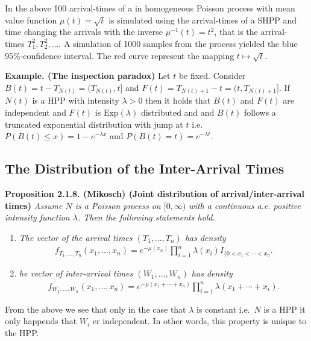 \documentclass[a4paper,12pt,openany]{book}
\providecommand{\tightlist}{%
 \setlength{\itemsep}{0pt}\setlength{\parskip}{0pt}}
\begin{document}
In the above 100 arrival-times of a in homogeneous Poisson process with mean value function \(\mu(t)=\sqrt{t}\) is simulated using the arrival-times of a SHPP and time changing the arrivals with the inverse \(\mu^{-1}(t)=t^2\), that is the arrival- times \(T_1^2,T_2^2,...\). A simulation of 1000 samples from the process yielded the blue 95\%-confidence interval. The red curve represent the mapping \(t\mapsto \sqrt{t}\).

\textbf{Example. (The inspection paradox)} Let \(t\) be fixed. Consider \(B(t)=t-T_{N(t)}=(T_{N(t)},t]\) and \(F(t)=T_{N(t)+1}-t=(t,T_{N(t)+1}]\). If \(N(t)\) is a HPP with intensity \(\lambda>0\) then it holds that \(B(t)\) and \(F(t)\) are independent and \(F(t)\) is \(\text{Exp}(\lambda)\) distributed and and \(B(t)\) follows a truncated exponential distribution with jump at \(t\) i.e.~\(P(B(t)\le x)=1-e^{-\lambda x}\) and \(P(B(t)=t)=e^{-\lambda t}\).

\hypertarget{the-distribution-of-the-inter-arrival-times}{%
\subsection{The Distribution of the Inter-Arrival Times}\label{the-distribution-of-the-inter-arrival-times}}

\textbf{Proposition 2.1.8. (Mikosch) (Joint distribution of arrival/inter-arrival times)} \emph{Assume \(N\) is a Poisson process on \([0, \infty)\) with a continuous a.e. positive intensity function \(\lambda\). Then the following statements hold.}

\begin{enumerate}
\def\labelenumi{(\arabic{enumi})}
\tightlist
\item
  \emph{The vector of the arrival times \((T_1,...,T_n)\) has density}
  \begin{align*}
    f_{T_1,...,T_n}(x_1,...,x_n)=e^{-\mu(x_n)}\prod_{i=1}^n\lambda(x_i)I_{\{0<x_1<\cdots <x_n}.
    \end{align*}
\item
  \emph{he vector of inter-arrival times \((W_1,...,W_n)\) has density}
  \begin{align*}
    f_{W_1,...,W_n}(x_1,...,x_n)=e^{-\mu(x_1+\cdots+x_n)}\prod_{i=1}^n\lambda(x_1+\cdots +x_i).
    \end{align*}
\end{enumerate}

From the above we see that only in the case that \(\lambda\) is constant i.e.~\(N\) is a HPP it only happends that \(W_i\) er independent. In other words, this property is unique to the HPP.
\end{document}
